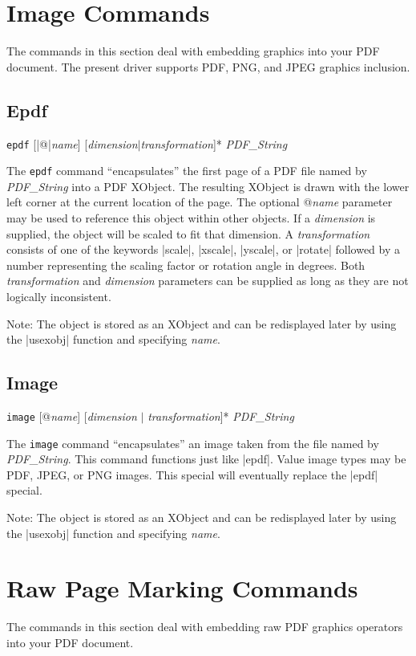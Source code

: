 {\section{Image Commands}
The commands in this section deal with embedding
graphics into your PDF document.  The present
driver supports PDF, PNG, and JPEG graphics inclusion.

\subsection{Epdf}
\syntax
{\tt epdf} [|@|{\it name}] [{\it dimension}$\vert${\it transformation}]*  {\it PDF\_String}

\description
The {\tt epdf} command ``encapsulates'' the first page of a PDF
file named by {\it PDF\_String}
into a PDF XObject.  The resulting XObject is drawn
with the lower left corner at the current location of the page.
The optional @{\it name} parameter may be used
to reference this object within other objects.  If a
{\it dimension} is supplied, the object will be scaled to fit
that dimension.  A {\it transformation} consists of one of the keywords
|scale|, |xscale|, |yscale|, or |rotate|
followed by a number representing
the scaling factor or rotation angle in degrees.  Both {\it transformation} and {\it dimension}
parameters can be supplied as long as they are not logically
inconsistent.

Note: The object is stored as an XObject and can be redisplayed later by using the
|usexobj| function and specifying {\it name}.

\example
\begintt
{}
\endtt

\subsection{Image}
\syntax
{\tt image} [@{\it name}] [{\it dimension} $\vert$ {\it transformation}]*  {\it PDF\_String}

\description
The {\tt image} command ``encapsulates'' an image
taken from the file named by {\it PDF\_String}.
This command functions just like |epdf|.  Value
image types may be PDF, JPEG, or PNG images.
This special will eventually replace the |epdf| special.

Note: The object is stored as an XObject and can be redisplayed later by using the
|usexobj| function and specifying {\it name}.

\section{Raw Page Marking Commands}
The commands in this section deal with embedding
raw PDF graphics operators into your PDF document.

}
